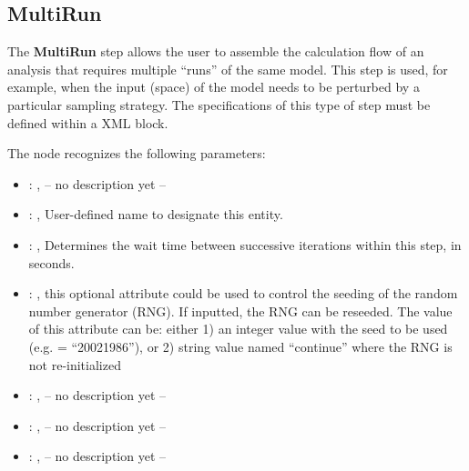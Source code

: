 \subsection{MultiRun}
   The \textbf{MultiRun} step allows the user to assemble the calculation flow of an analysis that
  requires multiple ``runs'' of the same model. This step is used, for example, when the input
  (space) of the model needs to be perturbed by a particular sampling strategy. The specifications
  of this type of step must be defined within a  XML block.

  The  node recognizes the following parameters:
    \begin{itemize}
      \item {}: , 
        -- no description yet --
      \item {}: , 
        User-defined name to designate this entity.
      \item {}: , 
        Determines the wait time between successive iterations within this step, in seconds.
      \item {}: , 
         this optional attribute could be used to control the seeding of the random number generator
        (RNG). If inputted, the RNG can be reseeded. The value of this attribute can be: either 1)
        an integer value with the seed to be used (e.g.  = ``20021986''), or 2)
        string value named ``continue'' where the RNG is not re-initialized
      \item {}: , 
        -- no description yet --
      \item {}: , 
        -- no description yet --
      \item {}: , 
        -- no description yet --
  \end{itemize}

